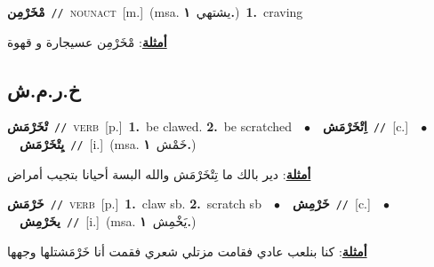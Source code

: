 \documentclass[10pt,a4paper,twoside]{article} %
\begin{document}
\begin{multicols}{2}
{\setlength\topsep{0pt}\textbf{\foreignlanguage{arabic}{مْخَرْمِن}}\ {\color{gray}\texttt{//}\color{black}}\ \textsc{noun\textunderscore act}\ [m.]\ \color{gray}(msa. \foreignlanguage{arabic}{يشتهي}~\foreignlanguage{arabic}{\textbf{١.}})\color{black}\ \textbf{1.}~craving\  \begin{flushright}\color{gray}\foreignlanguage{arabic}{\textbf{\underline{\foreignlanguage{arabic}{أمثلة}}}: مْخَرْمِن عسيجارة و قهوة}\end{flushright}\color{black}} \vspace{2mm}

\vspace{-3mm}
\subsection*{\color{blue}\foreignlanguage{arabic}{خ.ر.م.ش}\color{blue}{}} 

{\setlength\topsep{0pt}\textbf{\foreignlanguage{arabic}{تْخَرْمَش}}\ {\color{gray}\texttt{//}\color{black}}\ \textsc{verb}\ [p.]\ \textbf{1.}~be clawed.  \textbf{2.}~be scratched\ \ $\bullet$\ \ \setlength\topsep{0pt}\textbf{\foreignlanguage{arabic}{اِتْخَرْمَش}}\ {\color{gray}\texttt{//}\color{black}}\ [c.]\ \ $\bullet$\ \ \setlength\topsep{0pt}\textbf{\foreignlanguage{arabic}{يِتْخَرْمَش}}\ {\color{gray}\texttt{//}\color{black}}\ [i.]\ \color{gray}(msa. \foreignlanguage{arabic}{خَمْش}~\foreignlanguage{arabic}{\textbf{١.}})\color{black}\  \begin{flushright}\color{gray}\foreignlanguage{arabic}{\textbf{\underline{\foreignlanguage{arabic}{أمثلة}}}: دير بالك ما تِتْخَرْمَش والله البسة أحيانا بتجيب أمراض}\end{flushright}\color{black}} \vspace{2mm}

{\setlength\topsep{0pt}\textbf{\foreignlanguage{arabic}{خَرْمَش}}\ {\color{gray}\texttt{//}\color{black}}\ \textsc{verb}\ [p.]\ \textbf{1.}~claw sb.  \textbf{2.}~scratch sb\ \ $\bullet$\ \ \setlength\topsep{0pt}\textbf{\foreignlanguage{arabic}{خَرْمِش}}\ {\color{gray}\texttt{//}\color{black}}\ [c.]\ \ $\bullet$\ \ \setlength\topsep{0pt}\textbf{\foreignlanguage{arabic}{يخَرْمِش}}\ {\color{gray}\texttt{//}\color{black}}\ [i.]\ \color{gray}(msa. \foreignlanguage{arabic}{يَخْمِش}~\foreignlanguage{arabic}{\textbf{١.}})\color{black}\  \begin{flushright}\color{gray}\foreignlanguage{arabic}{\textbf{\underline{\foreignlanguage{arabic}{أمثلة}}}: كنا بنلعب عادي فقامت مزتلي شعري فقمت أنا خَرْمَشتلها وجهها}\end{flushright}\color{black}} \vspace{2mm}


\end{multicols}
\end{document}
